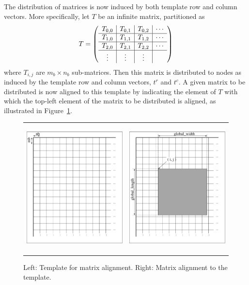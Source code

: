 The distribution of matrices is now induced by both template 
row and column vectors.
More specifically, let $ T $ be an infinite matrix,
partitioned as
\[
T = \left( \begin{array}{c | c | c | c}
T_{0,0} & T_{0,1} &  T_{0,2} & \cdots \\ \hline
T_{1,0} & T_{1,1} &  T_{1,2} & \cdots \\ \hline
T_{2,0} & T_{2,1} &  T_{2,2} & \cdots \\ \hline
\vdots &  \vdots  &  \vdots  &
\end{array}
\right)
\]
where $ T_{i,j} $ are $ m_b \times n_b $ sub-matrices.
Then this matrix is distributed to
nodes as induced by the template row and column vectors,
$ t^r$ and $ t^c $.
A given matrix to be distributed is now aligned to
this template by indicating the element of $ T $ with
which the top-left element of the matrix to be distributed
is aligned, as illustrated in  Figure~\ref{fig:matrixalign}.
\begin{figure}[htbp]
\begin{center}
\begin{tabular}{ c c }
\includegraphics[height=2.75in,width=2.75in]{figures/template.eps}
&
\includegraphics[height=2.75in,width=2.75in]{figures/align.eps}
\end{tabular}
\end{center}
\caption{Left: Template for matrix alignment.
Right: Matrix alignment to the template.}
\label{fig:matrixalign}
\end{figure}


